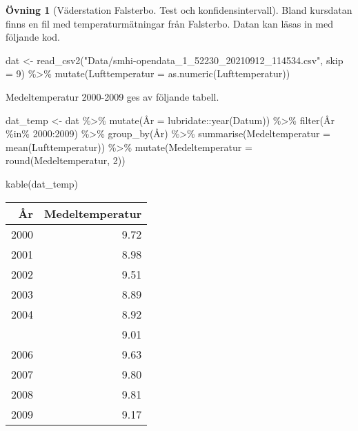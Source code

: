 \documentclass[
]{book}
\newenvironment{Shaded}{\begin{snugshade}}{\end{snugshade}}
\newcommand{\AttributeTok}[1]{\textcolor[rgb]{0.77,0.63,0.00}{#1}}
\newcommand{\DecValTok}[1]{\textcolor[rgb]{0.00,0.00,0.81}{#1}}
\newcommand{\FunctionTok}[1]{\textcolor[rgb]{0.00,0.00,0.00}{#1}}
\newcommand{\NormalTok}[1]{#1}
\newcommand{\OtherTok}[1]{\textcolor[rgb]{0.56,0.35,0.01}{#1}}
\newcommand{\SpecialCharTok}[1]{\textcolor[rgb]{0.00,0.00,0.00}{#1}}
\newcommand{\StringTok}[1]{\textcolor[rgb]{0.31,0.60,0.02}{#1}}
\theoremstyle{definition}
\theoremstyle{definition}
\theoremstyle{definition}
\newtheorem{exercise}{Övning}[chapter]
\theoremstyle{definition}
\theoremstyle{remark}
\begin{document}
\begin{exercise}[Väderstation Falsterbo. Test och konfidensintervall]
Bland kursdatan finns en fil med temperaturmätningar från Falsterbo. Datan kan läsas in med följande kod.

\begin{Shaded}
\begin{Highlighting}[]
\NormalTok{dat }\OtherTok{\textless{}{-}} \FunctionTok{read\_csv2}\NormalTok{(}\StringTok{"Data/smhi{-}opendata\_1\_52230\_20210912\_114534.csv"}\NormalTok{, }\AttributeTok{skip =} \DecValTok{9}\NormalTok{) }\SpecialCharTok{\%\textgreater{}\%} 
  \FunctionTok{mutate}\NormalTok{(}\AttributeTok{Lufttemperatur =} \FunctionTok{as.numeric}\NormalTok{(Lufttemperatur))}
\end{Highlighting}
\end{Shaded}

Medeltemperatur 2000-2009 ges av följande tabell.

\begin{Shaded}
\begin{Highlighting}[]
\NormalTok{dat\_temp }\OtherTok{\textless{}{-}}\NormalTok{ dat }\SpecialCharTok{\%\textgreater{}\%} 
  \FunctionTok{mutate}\NormalTok{(Å}\AttributeTok{r =}\NormalTok{ lubridate}\SpecialCharTok{::}\FunctionTok{year}\NormalTok{(Datum)) }\SpecialCharTok{\%\textgreater{}\%} 
  \FunctionTok{filter}\NormalTok{(År }\SpecialCharTok{\%in\%} \DecValTok{2000}\SpecialCharTok{:}\DecValTok{2009}\NormalTok{) }\SpecialCharTok{\%\textgreater{}\%} 
  \FunctionTok{group\_by}\NormalTok{(År) }\SpecialCharTok{\%\textgreater{}\%} 
  \FunctionTok{summarise}\NormalTok{(}\AttributeTok{Medeltemperatur =} \FunctionTok{mean}\NormalTok{(Lufttemperatur)) }\SpecialCharTok{\%\textgreater{}\%} 
  \FunctionTok{mutate}\NormalTok{(}\AttributeTok{Medeltemperatur =} \FunctionTok{round}\NormalTok{(Medeltemperatur, }\DecValTok{2}\NormalTok{))}

\FunctionTok{kable}\NormalTok{(dat\_temp)}
\end{Highlighting}
\end{Shaded}

\begin{table}
\centering
\begin{tabular}[t]{rr}
\toprule
År & Medeltemperatur\\
\midrule
2000 & 9.72\\
2001 & 8.98\\
2002 & 9.51\\
2003 & 8.89\\
2004 & 8.92\\
\addlinespace
2005 & 9.01\\
2006 & 9.63\\
2007 & 9.80\\
2008 & 9.81\\
2009 & 9.17\\
\bottomrule
\end{tabular}
\end{table}


\end{exercise}
\end{document}
